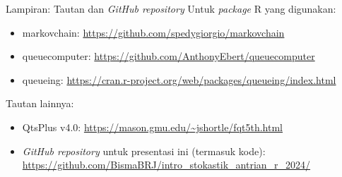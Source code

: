 \documentclass{beamer}
\begin{document}
\begin{frame}{Lampiran: Tautan dan \textit{GitHub repository}}
    Untuk \textit{package} R yang digunakan:
    \begin{itemize}
        \item markovchain: \url{https://github.com/spedygiorgio/markovchain}

        \item queuecomputer: \url{https://github.com/AnthonyEbert/queuecomputer}
        
        \item queueing: \url{https://cran.r-project.org/web/packages/queueing/index.html}
    \end{itemize}

    Tautan lainnya:

    \begin{itemize}
        \item QtsPlus v4.0: \url{https://mason.gmu.edu/~jshortle/fqt5th.html}
        
        \item \textit{GitHub repository} untuk presentasi ini (termasuk kode): \url{https://github.com/BismaBRJ/intro_stokastik_antrian_r_2024/}
    \end{itemize}
\end{frame}
\end{document}
